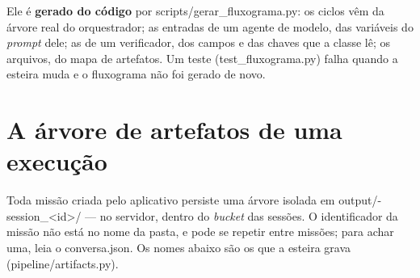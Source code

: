 \documentclass[11pt,a4paper]{article}
\newcommand{\cod}[1]{{\ttfamily\small #1}}
\begin{document}
Ele é \textbf{gerado do código} por \cod{scripts/gerar\_fluxograma.py}: os ciclos vêm da árvore real do orquestrador; as entradas de um agente de modelo, das variáveis do \emph{prompt} dele; as de um verificador, dos campos e das chaves que a classe lê; os arquivos, do mapa de artefatos. Um teste (\cod{test\_fluxograma.py}) falha quando a esteira muda e o fluxograma não foi gerado de novo.

\section{A árvore de artefatos de uma execução}
\label{ap:artefatos}

Toda missão criada pelo aplicativo persiste uma árvore isolada em \cod{output/\allowbreak <data-hora>-\allowbreak session\_<id>/} --- no servidor, dentro do \emph{bucket} das sessões. O identificador da missão não está no nome da pasta, e pode se repetir entre missões; para achar uma, leia o \cod{conversa.json}. Os nomes abaixo são os que a esteira grava (\cod{pipeline/artifacts.py}).
\end{document}
